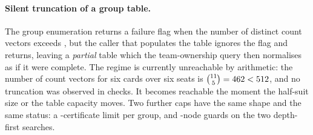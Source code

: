 \paragraph{Silent truncation of a group table.} The group enumeration returns a
failure flag when the number of distinct count vectors exceeds
\numMaxEnt{}, but the caller that populates the table ignores the flag and
returns, leaving a \emph{partial} table which the team-ownership query then
normalises as if it were complete. The regime is currently unreachable by
arithmetic: the number of count vectors for six cards over six seats is
$\binom{11}{5} = 462{} < 512{}$, and no truncation was
observed in \numAllocSurvivalChecks{} checks. It becomes reachable the moment the
half-suit size or the table capacity moves. Two further caps have the same shape
and the same status: a \numCertCap{}-certificate limit per group, and
\numNodeGuard{}-node guards on the two depth-first searches.

